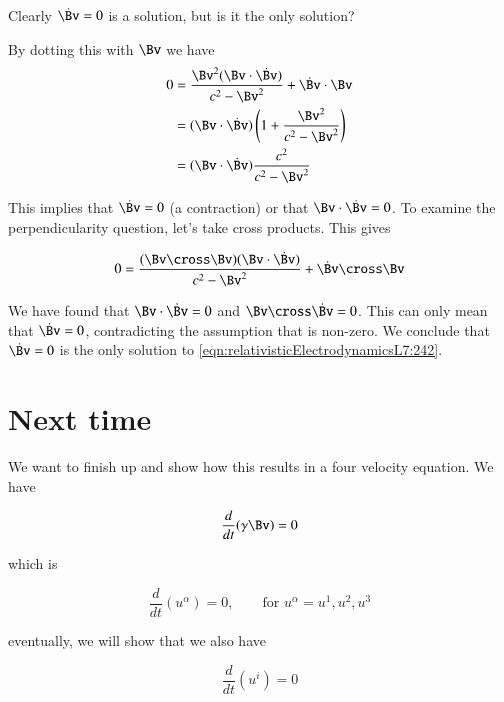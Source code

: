 Clearly $\dot{\Bv} = 0$ is a solution, but is it the only solution?

By dotting this with $\Bv$ we have
\begin{align*}
0 
&= \frac{\Bv^2 (\Bv \cdot \dot{\Bv}) }{ c^2 - \Bv^2 } + \dot{\Bv} \cdot \Bv  \\
&= (\Bv \cdot \dot{\Bv}) \left( 1 + \frac{\Bv^2}{c^2 - \Bv^2} \right) \\
&= (\Bv \cdot \dot{\Bv}) \frac{c^2}{c^2 - \Bv^2} 
\end{align*}

This implies that $\dot{\Bv} = 0$ (a contraction) or that $\Bv \cdot \dot{\Bv} = 0$.  To examine the perpendicularity question, let's take cross products.  This gives

\begin{equation}\label{eqn:relativisticElectrodynamicsL7:243}
0 =
\frac{(\Bv \cross \Bv) (\Bv \cdot \dot{\Bv}) }{ c^2 - \Bv^2 } + \dot{\Bv} \cross \Bv
\end{equation}

We have found that $\Bv \cdot \dot{\Bv} = 0$ and $\Bv \cross \dot{\Bv} = 0$.  This can only mean that $\dot{\Bv} = 0$, contradicting the assumption that is non-zero.  We conclude that $\dot{\Bv} = 0$ is the only solution to \ref{eqn:relativisticElectrodynamicsL7:242}.

\section{Next time}

We want to finish up and show how this results in a four velocity equation.  We have

\begin{equation}\label{eqn:relativisticElectrodynamicsL7:250}
\frac{d}{dt} ( \gamma \Bv) = 0
\end{equation}

which is

\begin{equation}\label{eqn:relativisticElectrodynamicsL7:260}
\frac{d}{dt} ( u^\alpha ) = 0, \qquad \mbox{for $u^\alpha = u^1, u^2, u^3$}
\end{equation}

eventually, we will show that we also have

\begin{equation}\label{eqn:relativisticElectrodynamicsL7:270}
\frac{d}{dt} ( u^i ) = 0
\end{equation}

\EndArticle
